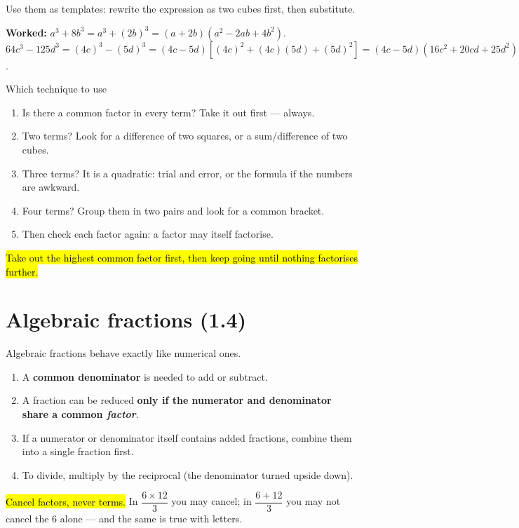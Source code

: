 \documentclass[11pt]{article}
\newcommand{\key}[1]{\hl{#1}}
\newcommand{\wex}[1]{\textbf{\color{lilacdeep}Worked:} #1}
\begin{document}
Use them as templates: rewrite the expression as two cubes first, then substitute.

\wex{$a^{3}+8b^{3}=a^{3}+(2b)^{3}=(a+2b)(a^{2}-2ab+4b^{2})$.\\
$64c^{3}-125d^{3}=(4c)^{3}-(5d)^{3}=(4c-5d)\!\left[(4c)^{2}+(4c)(5d)+(5d)^{2}\right]=(4c-5d)(16c^{2}+20cd+25d^{2})$.}

\begin{methodbox}{Which technique to use}
\begin{enumerate}[topsep=1pt,itemsep=0pt,leftmargin=*]
\item Is there a common factor in every term? Take it out first --- always.
\item Two terms? Look for a difference of two squares, or a sum/difference of two cubes.
\item Three terms? It is a quadratic: trial and error, or the formula if the numbers are awkward.
\item Four terms? Group them in two pairs and look for a common bracket.
\item Then check each factor again: a factor may itself factorise.
\end{enumerate}
\key{Take out the highest common factor first, then keep going until nothing factorises further.}
\end{methodbox}

\section{Algebraic fractions (1.4)}

Algebraic fractions behave exactly like numerical ones.

\begin{formulabox}
\begin{enumerate}[topsep=1pt,itemsep=0pt,leftmargin=*]
\item A \textbf{common denominator} is needed to add or subtract.
\item A fraction can be reduced \textbf{only if the numerator and denominator share a common \emph{factor}}.
\item If a numerator or denominator itself contains added fractions, combine them into a single fraction first.
\item To divide, multiply by the reciprocal (the denominator turned upside down).
\end{enumerate}
\end{formulabox}

\key{Cancel factors, never terms.} In $\dfrac{6\times12}{3}$ you may cancel; in $\dfrac{6+12}{3}$ you may not cancel the 6 alone --- and the same is true with letters.
\end{document}
